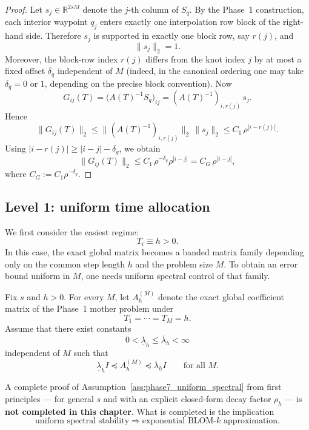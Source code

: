 \begin{proof}
	Let \(s_j\in\mathbb R^{2sM}\) denote the \(j\)-th column of \(S_q\).
	By the Phase~1 construction, each interior waypoint \(q_j\) enters exactly one interpolation row block of the right-hand side.
	Therefore \(s_j\) is supported in exactly one block row, say \(r(j)\), and
	\[
	\|s_j\|_2 = 1.
	\]
	Moreover, the block-row index \(r(j)\) differs from the knot index \(j\) by at most a fixed offset \(\delta_q\) independent of \(M\) (indeed, in the canonical ordering one may take \(\delta_q=0\) or \(1\), depending on the precise block convention).
	Now
	\[
	G_{ij}(T)
	=
	\bigl(A(T)^{-1}S_q\bigr)_{ij}
	=
	(A(T)^{-1})_{i,r(j)}\,s_j.
	\]
	Hence
	\[
	\|G_{ij}(T)\|_2
	\le
	\|(A(T)^{-1})_{i,r(j)}\|_2\,\|s_j\|_2
	\le
	C_1\,\rho^{|i-r(j)|}.
	\]
	Using \(|i-r(j)|\ge |i-j|-\delta_q\), we obtain
	\[
	\|G_{ij}(T)\|_2
	\le
	C_1\,\rho^{-\delta_q}\rho^{|i-j|}
	=
	C_G\,\rho^{|i-j|},
	\]
	where \(C_G:=C_1\rho^{-\delta_q}\).
\end{proof}

\subsection{Level 1: uniform time allocation}
\label{subsec:phase7_uniform_time}

We first consider the easiest regime:
\[
T_i\equiv h>0.
\]
In this case, the exact global matrix becomes a banded matrix family depending only on the common step length \(h\) and the problem size \(M\).
To obtain an error bound uniform in \(M\), one needs uniform spectral control of that family.

\begin{assumption}
	\label{ass:phase7_uniform_spectral}
	Fix \(s\) and \(h>0\).
	For every \(M\), let \(A_h^{(M)}\) denote the exact global coefficient matrix of the Phase~1 mother problem under
	\[
	T_1=\cdots=T_M=h.
	\]
	Assume that there exist constants
	\[
	0<\underline\lambda_h\le \overline\lambda_h<\infty
	\]
	independent of \(M\) such that
	\begin{equation}
		\label{eq:phase7_uniform_spectral}
		\underline\lambda_h I \preceq A_h^{(M)} \preceq \overline\lambda_h I
		\qquad
		\text{for all } M.
	\end{equation}
\end{assumption}

\begin{remark}
	\label{rem:phase7_uniform_spectral_limitation}
	A complete proof of Assumption~\ref{ass:phase7_uniform_spectral} from first principles --- for general \(s\) and with an explicit closed-form decay factor \(\rho_h\) --- is \textbf{not completed in this chapter}.
	What is completed is the implication
	\[
	\text{uniform spectral stability}
	\Longrightarrow
	\text{exponential BLOM-\(k\) approximation}.
	\]
\end{remark}

